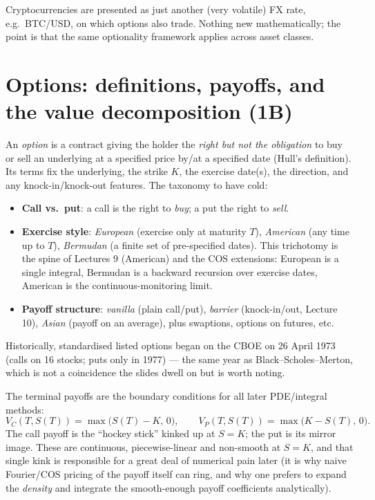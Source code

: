 \documentclass[11pt]{article}
\begin{document}
Cryptocurrencies are presented as just another (very volatile) FX rate, e.g.\ BTC/USD, on which options also trade. Nothing new mathematically; the point is that the same optionality framework applies across asset classes.

\section{Options: definitions, payoffs, and the value decomposition (1B)}

An \emph{option} is a contract giving the holder the \emph{right but not the obligation} to buy or sell an underlying at a specified price by/at a specified date (Hull's definition). Its terms fix the underlying, the strike $K$, the exercise date(s), the direction, and any knock-in/knock-out features. The taxonomy to have cold:
\begin{itemize}[nosep]
\item \textbf{Call vs.\ put}: a call is the right to \emph{buy}; a put the right to \emph{sell}.
\item \textbf{Exercise style}: \emph{European} (exercise only at maturity $T$), \emph{American} (any time up to $T$), \emph{Bermudan} (a finite set of pre-specified dates). This trichotomy is the spine of Lectures 9 (American) and the COS extensions: European is a single integral, Bermudan is a backward recursion over exercise dates, American is the continuous-monitoring limit.
\item \textbf{Payoff structure}: \emph{vanilla} (plain call/put), \emph{barrier} (knock-in/out, Lecture 10), \emph{Asian} (payoff on an average), plus swaptions, options on futures, etc.
\end{itemize}
Historically, standardised listed options began on the CBOE on 26 April 1973 (calls on 16 stocks; puts only in 1977) --- the same year as Black--Scholes--Merton, which is not a coincidence the slides dwell on but is worth noting.

The terminal payoffs are the boundary conditions for all later PDE/integral methods:
\[
V_C(T,S(T))=\max\!\big(S(T)-K,\,0\big),
\qquad
V_P(T,S(T))=\max\!\big(K-S(T),\,0\big).
\]
The call payoff is the ``hockey stick'' kinked up at $S=K$; the put is its mirror image. These are continuous, piecewise-linear and non-smooth at $S=K$, and that single kink is responsible for a great deal of numerical pain later (it is why naive Fourier/COS pricing of the payoff itself can ring, and why one prefers to expand the \emph{density} and integrate the smooth-enough payoff coefficients analytically).
\end{document}
